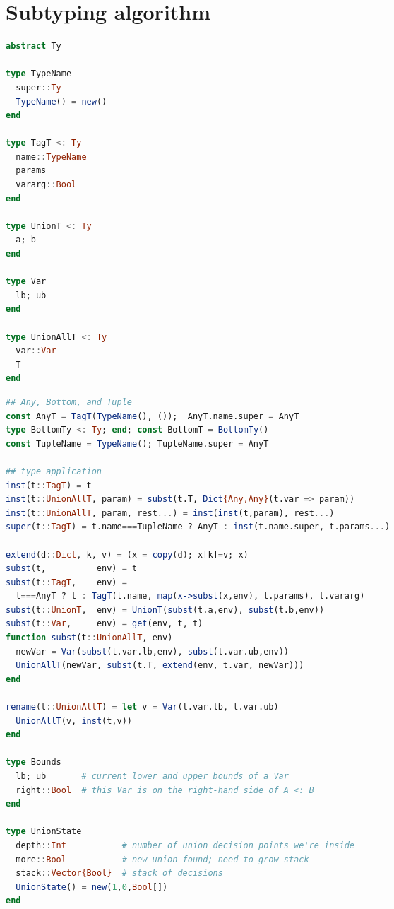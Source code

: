 \chapter{Subtyping algorithm}

\begin{singlespace}
\begin{multicols}{2}
\begin{lstlisting}[language=julia]
abstract Ty

type TypeName
  super::Ty
  TypeName() = new()
end

type TagT <: Ty
  name::TypeName
  params
  vararg::Bool
end

type UnionT <: Ty
  a; b
end

type Var
  lb; ub
end

type UnionAllT <: Ty
  var::Var
  T
end
\end{lstlisting}
\end{multicols}

\vspace{-3ex}
\begin{lstlisting}[language=julia]
## Any, Bottom, and Tuple
const AnyT = TagT(TypeName(), ());  AnyT.name.super = AnyT
type BottomTy <: Ty; end; const BottomT = BottomTy()
const TupleName = TypeName(); TupleName.super = AnyT

## type application
inst(t::TagT) = t
inst(t::UnionAllT, param) = subst(t.T, Dict{Any,Any}(t.var => param))
inst(t::UnionAllT, param, rest...) = inst(inst(t,param), rest...)
super(t::TagT) = t.name===TupleName ? AnyT : inst(t.name.super, t.params...)

extend(d::Dict, k, v) = (x = copy(d); x[k]=v; x)
subst(t,          env) = t
subst(t::TagT,    env) =
  t===AnyT ? t : TagT(t.name, map(x->subst(x,env), t.params), t.vararg)
subst(t::UnionT,  env) = UnionT(subst(t.a,env), subst(t.b,env))
subst(t::Var,     env) = get(env, t, t)
function subst(t::UnionAllT, env)
  newVar = Var(subst(t.var.lb,env), subst(t.var.ub,env))
  UnionAllT(newVar, subst(t.T, extend(env, t.var, newVar)))
end

rename(t::UnionAllT) = let v = Var(t.var.lb, t.var.ub)
  UnionAllT(v, inst(t,v))
end

type Bounds
  lb; ub       # current lower and upper bounds of a Var
  right::Bool  # this Var is on the right-hand side of A <: B
end

type UnionState
  depth::Int           # number of union decision points we're inside
  more::Bool           # new union found; need to grow stack
  stack::Vector{Bool}  # stack of decisions
  UnionState() = new(1,0,Bool[])
end


\end{lstlisting}
\end{singlespace}
